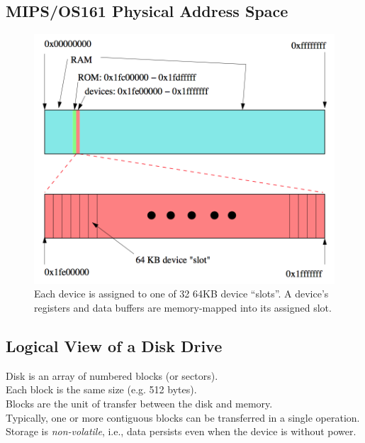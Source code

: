 \documentclass[12pt]{article}
\theoremstyle{plain}
\theoremstyle{definition}
\begin{document}
\subsection{MIPS/OS161 Physical Address Space}
\begin{figure}[H]
  \centering
  \includegraphics[scale=0.55]{pictures/os161_addrspace.png}
  \caption{Each device is assigned to one of 32 64KB device ``slots''. A device's registers and data buffers are memory-mapped into its assigned slot.}
  \label{fig:os161_addrspace}
\end{figure}

\subsection{Logical View of a Disk Drive}
Disk is an array of numbered blocks (or sectors). \\
Each block is the same size (e.g. 512 bytes). \\

Blocks are the unit of transfer between the disk and memory. \\
Typically, one or more contiguous blocks can be transferred in a single operation. \\

Storage is \emph{non-volatile}, i.e., data persists even when the device is without power.
\end{document}

